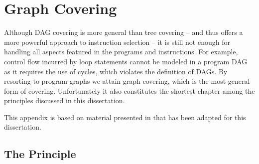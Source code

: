 %

\chapter{Graph Covering}


Although \gls{DAG covering} is more general than \gls{tree covering} -- and thus
offers a more powerful approach to \gls{instruction selection} -- it is still
not enough for handling all aspects featured in the \glspl{program} and
\glspl{instruction}.
%
For example, control flow incurred by loop statements
cannot be modeled in a \gls{program DAG} as it requires the use of
\glspl{cycle}, which violates the definition of \glspl{DAG}.
%
By resorting to
\glspl{program graph} we attain \gls{graph covering}, which is the most general
form of covering.
%
Unfortunately it also constitutes the shortest chapter among
the \glspl{principle} discussed in this dissertation.

This appendix is based on material presented in
\cite[Chap.]{HjortBlindell:2016:Survey} that has been adapted for
this dissertation.


\section{The Principle}



